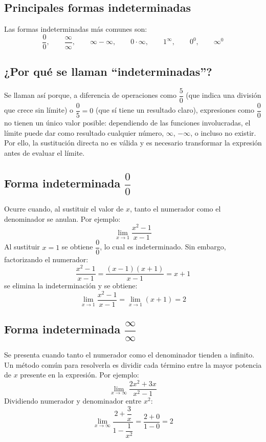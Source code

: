 \documentclass[12pt]{article}
\begin{document}
\subsection{Principales formas indeterminadas}

Las formas indeterminadas más comunes son:
\[
\frac{0}{0}, \qquad \frac{\infty}{\infty}, \qquad \infty - \infty, \qquad 0 \cdot \infty, \qquad 1^{\infty}, \qquad 0^0, \qquad \infty^0
\]

\subsection{¿Por qué se llaman ``indeterminadas''?}

Se llaman así porque, a diferencia de operaciones como $\dfrac{5}{0}$ (que indica una división que crece sin límite) o $\dfrac{0}{5} = 0$ (que sí tiene un resultado claro), expresiones como $\dfrac{0}{0}$ no tienen un único valor posible: dependiendo de las funciones involucradas, el límite puede dar como resultado cualquier número, $\infty$, $-\infty$, o incluso no existir. Por ello, la sustitución directa no es válida y es necesario transformar la expresión antes de evaluar el límite.

\subsection{Forma indeterminada $\dfrac{0}{0}$}

Ocurre cuando, al sustituir el valor de $x$, tanto el numerador como el denominador se anulan. Por ejemplo:
\[
\lim_{x \to 1} \frac{x^2 - 1}{x - 1}
\]
Al sustituir $x = 1$ se obtiene $\dfrac{0}{0}$, lo cual es indeterminado. Sin embargo, factorizando el numerador:
\[
\frac{x^2 - 1}{x - 1} = \frac{(x-1)(x+1)}{x-1} = x + 1
\]
se elimina la indeterminación y se obtiene:
\[
\lim_{x \to 1} \frac{x^2 - 1}{x - 1} = \lim_{x \to 1} (x + 1) = 2
\]

\subsection{Forma indeterminada $\dfrac{\infty}{\infty}$}

Se presenta cuando tanto el numerador como el denominador tienden a infinito. Un método común para resolverla es dividir cada término entre la mayor potencia de $x$ presente en la expresión. Por ejemplo:
\[
\lim_{x \to \infty} \frac{2x^2 + 3x}{x^2 - 1}
\]
Dividiendo numerador y denominador entre $x^2$:
\[
\lim_{x \to \infty} \frac{2 + \dfrac{3}{x}}{1 - \dfrac{1}{x^2}} = \frac{2 + 0}{1 - 0} = 2
\]
\end{document}
